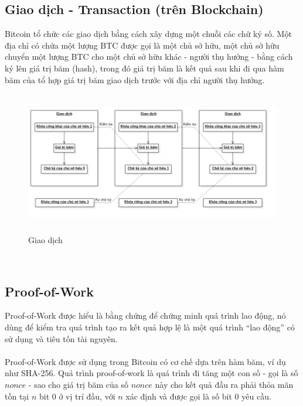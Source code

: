 \subsection{Giao dịch - Transaction (trên Blockchain)}
Bitcoin tổ chức các giao dịch bằng cách xây dựng một chuỗi các chữ ký số. Một 
địa chỉ có chứa một lượng BTC được gọi là một chủ sở hữu, một chủ sở hữu 
chuyển một lượng BTC cho một chủ sở hữu khác - người thụ hưởng - bằng cách ký 
lên giá trị băm (hash), trong đó giá trị băm là kết quả sau khi đi qua hàm băm
của tổ hợp giá trị băm giao dịch trước với địa chỉ người thụ hưởng.\\
\begin{figure}[h!]
\centering
\includegraphics[height=2.45in, keepaspectratio=true]{transaction.png}
\caption{Giao dịch}
\end{figure}\\
\subsection{Proof-of-Work}
Proof-of-Work được hiểu là bằng chứng để chứng minh quá trình lao động, nó dùng 
để kiểm tra quá trình tạo ra kết quả hợp lệ là một quá trình ``lao động'' có 
sử dụng và tiêu tốn tài nguyên.\\\\
Proof-of-Work được sử dụng trong Bitcoin có cơ chế dựa trên hàm băm, ví dụ như 
SHA-256. Quá trình proof-of-work là quá trình đi tăng một con số - gọi là số 
$nonce$ - sao cho giá trị băm của số $nonce$ này cho kết quả đầu ra phải thỏa 
mãn tồn tại $n$ bit 0 ở vị trí đầu, với $n$ xác định và được gọi là số bit 0 
yêu cầu.

